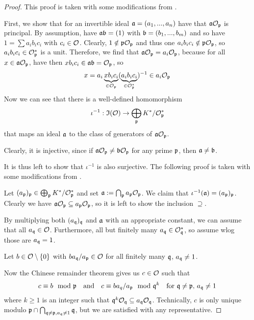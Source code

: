 \begin{proof}
    This proof is taken with some modifications from \cite[Prop.~I.12.9]{neukirch}.

    First, we show that for an invertible ideal $\mathfrak{a} = (a_1, ..., a_n)$ have that $\mathfrak{a}\mathcal{O}_{\mathfrak{p}}$ is principal.
    By assumption, have $\mathfrak{a}\mathfrak{b} = (1)$ with $\mathfrak{b} = (b_1, ..., b_m)$ and so have $1 = \sum a_i b_i c_i$ with $c_i \in \mathcal{O}$.
    Clearly, $1 \notin \mathfrak{p}\mathcal{O}_{\mathfrak{p}}$ and thus one $a_i b_i c_i \notin \mathfrak{p}\mathcal{O}_{\mathfrak{p}}$, so $a_i b_i c_i \in \mathcal{O}_{\mathfrak{p}}^*$ is a unit.
    Therefore, we find that $\mathfrak{a}\mathcal{O}_{\mathfrak{p}} = a_i\mathcal{O}_{\mathfrak{p}}$, because for all $x \in \mathfrak{a}\mathcal{O}_{\mathfrak{p}}$, have then $x b_i c_i \in \mathfrak{a}\mathfrak{b} = \mathcal{O}_{\mathfrak{p}}$, so
    \begin{equation*}
        x = a_i \underbrace{x b_i c_i}_{\in \mathcal{O}_{\mathfrak{p}}} (\underbrace{a_ib_ic_i}_{\in\mathcal{O}_{\mathfrak{p}}^*})^{-1} \in a_i \mathcal{O}_{\mathfrak{p}}
    \end{equation*}
    Now we can see that there is a well-defined homomorphism
    \begin{equation*}
        \iota^{-1}: \mathfrak{I}(\mathcal{O}) \to \bigoplus_{\mathfrak{p}} K^*/\mathcal{O}_{\mathfrak{p}}^*
    \end{equation*}
    that maps an ideal $\mathfrak{a}$ to the class of generators of $\mathfrak{a}\mathcal{O}_{\mathfrak{p}}$.
    
    Clearly, it is injective, since if $\mathfrak{a}\mathcal{O}_{\mathfrak{p}} \neq \mathfrak{b}\mathcal{O}_{\mathfrak{p}}$ for any prime $\mathfrak{p}$, then $\mathfrak{a} \neq \mathfrak{b}$.

    It is thus left to show that $\iota^{-1}$ is also surjective.
    The following proof is taken with some modifications from \cite[Prop.~I.12.2]{neukirch}.

    Let $(a_{\mathfrak{p}})_{\mathfrak{p}} \in \bigoplus_{\mathfrak{p}} K^*/\mathcal{O}_{\mathfrak{p}}^*$ and set $\mathfrak{a} := \bigcap_{\mathfrak{p}} a_{\mathfrak{p}} \mathcal{O}_{\mathfrak{p}}$.
    We claim that $\iota^{-1}(\mathfrak{a}) = (a_{\mathfrak{p}})_{\mathfrak{p}}$. 
    Clearly we have $\mathfrak{a}\mathcal{O}_{\mathfrak{p}} \subseteq a_{\mathfrak{p}}\mathcal{O}_{\mathfrak{p}}$, so it is left to show the inclusion $\supseteq$.

    By multiplying both $(a_{\mathfrak{q}})_{\mathfrak{q}}$ and $\mathfrak{a}$ with an appropriate constant, we can assume that all $a_{\mathfrak{q}} \in \mathcal{O}$.
    Furthermore, all but finitely many $a_{\mathfrak{q}} \in \mathcal{O}_{\mathfrak{q}}^*$, so assume wlog those are $a_{\mathfrak{q}} = 1$.

    Let $b \in \mathcal{O} \setminus \{ 0 \}$ with $ba_{\mathfrak{q}}/a_{\mathfrak{p}} \in \mathcal{O}$ for all finitely many $\mathfrak{q}$, $a_{\mathfrak{q}} \neq 1$.

    Now the Chinese remainder theorem gives us $c \in \mathcal{O}$ such that
    \begin{equation*}
        c \equiv b \mod {\mathfrak{p}} \quad \text{and} \quad c \equiv b a_q/a_{\mathfrak{p}} \mod {\mathfrak{q}}^k \quad \text{for $\mathfrak{q} \neq \mathfrak{p}$, $a_{\mathfrak{q}} \neq 1$}
    \end{equation*}
    where $k \geq 1$ is an integer such that $\mathfrak{q}^k\mathcal{O}_{\mathfrak{q}} \subseteq a_{\mathfrak{q}}\mathcal{O}_{\mathfrak{q}}$.
    Technically, $c$ is only unique modulo $\mathfrak{p} \cap \bigcap_{\mathfrak{q} \neq \mathfrak{p}, a_{\mathfrak{q}} \neq 1} \mathfrak{q}$, but we are satisfied with any representative.


\end{proof}

